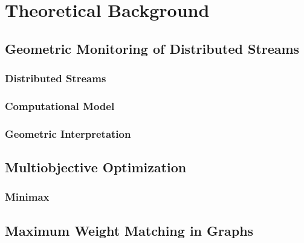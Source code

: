 \chapter{Theoretical Background}
\section{Geometric Monitoring of Distributed Streams}
\subsection{Distributed Streams}

\subsection{Computational Model}

\subsection{Geometric Interpretation}

\section{Multiobjective Optimization}

\subsection{Minimax}

\section{Maximum Weight Matching in Graphs}